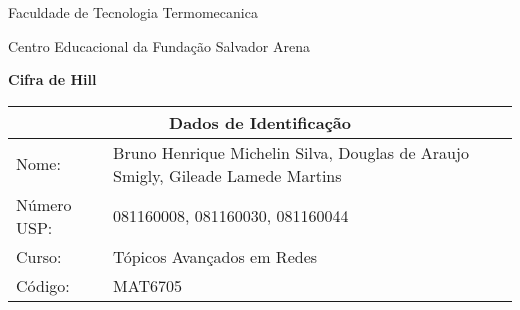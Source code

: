 \documentclass[oneside,a4paper,12pt]{article}
\theoremstyle{definition}
\theoremstyle{plain}
\theoremstyle{solu}
\theoremstyle{dotlessP}
\newcommand{\universidade}{Faculdade de Tecnologia Termomecanica}
\newcommand{\centro}{Centro Educacional da Fundação Salvador Arena}
\newcommand{\professor}{Bruno Henrique Michelin Silva, Douglas de Araujo Smigly, Gileade Lamede Martins}
\newcommand{\disciplina}{Tópicos Avançados em Redes}
\newcommand{\nusp}{081160008, 081160030, 081160044}
\newcommand{\sigla}{MAT6705}
\newcommand{\entrega}{9 de abril de 2018}
\begin{document}
	\thispagestyle{empty}
	
	\begin{center}
	 	\vspace{0pt}
	 	
		\universidade
		\par
		\centro
		\par
		\par
		\par
		\vspace{24pt}
		\LARGE \textbf{}
		\par
		\par
		\par
		\par
		\LARGE \textbf{Cifra de Hill}
		\par
		\par
		\par
		\par
		\par
	
	\end{center}
	
	\vspace{24pt}
	
%		
%	
	\begin{tabular}{ |l|p{11cm}| }
		
		\hline
		\multicolumn{2}{|c|}{\textbf{Dados de Identificação}} \\
			\hline
		Nome:        &  \professor \\
		\hline
		Número USP:      & \nusp  \\
		\hline
		Curso:        &  \disciplina \\
		\hline
		 Código:        &  \sigla \\
		\hline
	\end{tabular}
	\vspace{24pt}
\end{document}
